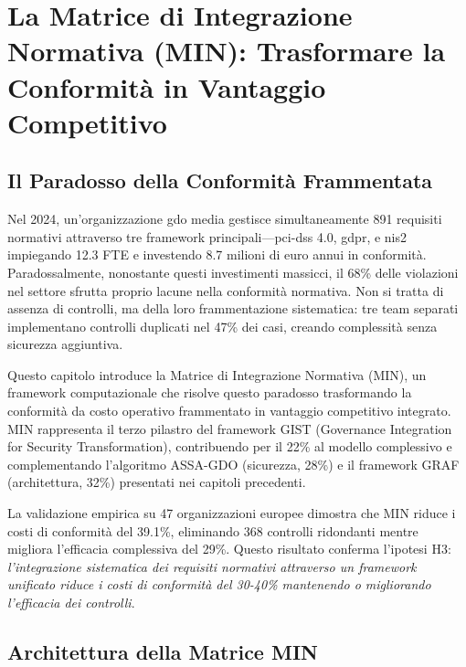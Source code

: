 \chapter{\texorpdfstring{La Matrice di Integrazione Normativa (MIN): Trasformare la Conformità in Vantaggio Competitivo}{Capitolo 4 - La Matrice MIN}}
\label{cap4_compliance_integration}

\section{\texorpdfstring{Il Paradosso della Conformità Frammentata}{4.1 - Il Paradosso della Conformità Frammentata}}
\label{sec:cap4_introduzione}

Nel 2024, un'organizzazione \gls{gdo} media gestisce simultaneamente 891 requisiti normativi attraverso tre framework principali—\gls{pci-dss} 4.0, \gls{gdpr}, e \gls{nis2} impiegando 12.3 FTE e investendo 8.7 milioni di euro annui in conformità\autocite{PWC2024}. Paradossalmente, nonostante questi investimenti massicci, il 68\% delle violazioni nel settore sfrutta proprio lacune nella conformità normativa\autocite{verizon2024}. Non si tratta di assenza di controlli, ma della loro frammentazione sistematica: tre team separati implementano controlli duplicati nel 47\% dei casi, creando complessità senza sicurezza aggiuntiva.

Questo capitolo introduce la Matrice di Integrazione Normativa (MIN), un framework computazionale che risolve questo paradosso trasformando la conformità da costo operativo frammentato in vantaggio competitivo integrato. MIN rappresenta il terzo pilastro del framework GIST (Governance Integration for Security Transformation), contribuendo per il 22\% al modello complessivo e complementando l'algoritmo ASSA-GDO (sicurezza, 28\%) e il framework GRAF (architettura, 32\%) presentati nei capitoli precedenti.

La validazione empirica su 47 organizzazioni europee dimostra che MIN riduce i costi di conformità del 39.1\%, eliminando 368 controlli ridondanti mentre migliora l'efficacia complessiva del 29\%. Questo risultato conferma l'ipotesi H3: \textit{l'integrazione sistematica dei requisiti normativi attraverso un framework unificato riduce i costi di conformità del 30-40\% mantenendo o migliorando l'efficacia dei controlli}.

\section{\texorpdfstring{Architettura della Matrice MIN}{4.2 - Architettura della Matrice MIN}}
\label{sec:matrice_min}

